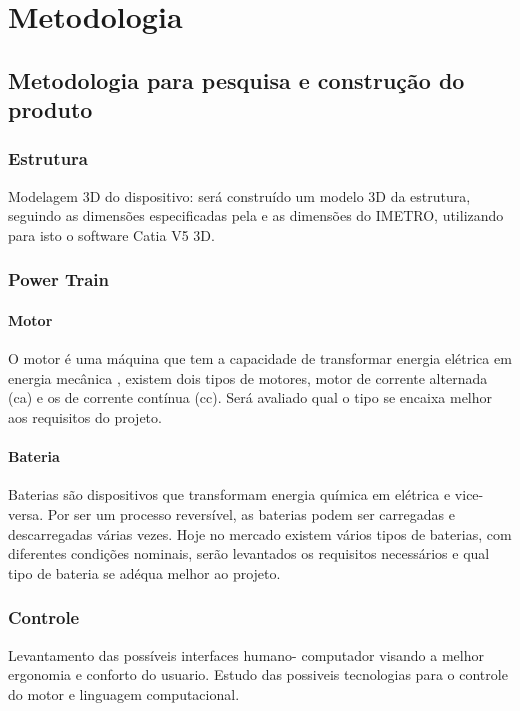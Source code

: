 \chapter[Metodologia]{Metodologia}

\section{Metodologia para pesquisa e construção do produto}

\subsection{Estrutura}
Modelagem 3D do dispositivo: será construído um modelo 3D da estrutura, seguindo as dimensões especificadas pela \cite[p.~97]{nbr9050} e as dimensões do IMETRO, utilizando para isto o software Catia V5 3D.

\subsection{Power Train}

\subsubsection{Motor}
O motor é uma máquina que tem a capacidade de transformar energia elétrica em energia mecânica \cite{projeto_cadeira_rodas_inteligente}, existem dois tipos de motores, motor de corrente alternada (ca) e os de corrente contínua (cc). Será avaliado qual o tipo se encaixa melhor aos requisitos do projeto.

\subsubsection{Bateria}
Baterias são dispositivos que transformam energia química em elétrica e vice-versa. Por ser um processo reversível, as baterias podem ser carregadas e descarregadas várias vezes. Hoje no mercado existem vários tipos de baterias, com diferentes condições nominais, serão levantados os requisitos necessários e qual tipo de bateria se adéqua melhor ao projeto.

\subsection{Controle}
Levantamento das possíveis interfaces humano- computador visando a melhor ergonomia e conforto do usuario. Estudo das possiveis tecnologias para o controle do motor e linguagem computacional.

